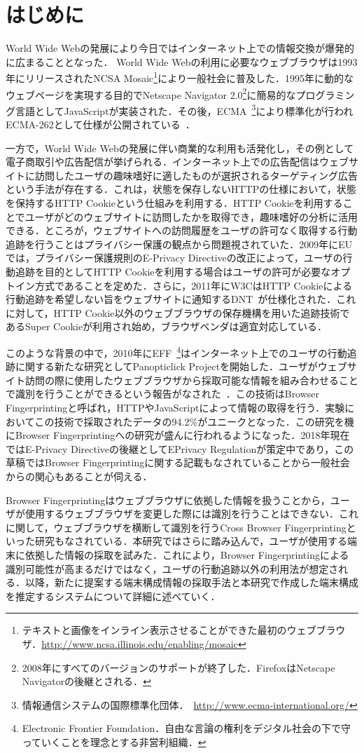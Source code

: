 \section{はじめに}
World Wide Webの発展により今日ではインターネット上での情報交換が爆発的に広まることとなった． World Wide Webの利用に必要なウェブブラウザは1993年にリリースされたNCSA Mosaic\footnote{テキストと画像をインライン表示させることができた最初のウェブブラウザ．\url{http://www.ncsa.illinois.edu/enabling/mosaic}}により一般社会に普及した．1995年に動的なウェブページを実現する目的でNetscape Navigator 2.0\footnote{2008年にすべてのバージョンのサポートが終了した．FirefoxはNetscape Navigatorの後継とされる．}に簡易的なプログラミング言語としてJavaScriptが実装された．その後，ECMA~\footnote{情報通信システムの国際標準化団体．~\url{http://www.ecma-international.org/}}により標準化が行われECMA-262として仕様が公開されている~\cite{ecma_262}．

一方で，World Wide Webの発展に伴い商業的な利用も活発化し，その例として電子商取引や広告配信が挙げられる．インターネット上での広告配信はウェブサイトに訪問したユーザの趣味嗜好に適したものが選択されるターゲティング広告という手法が存在する．これは，状態を保存しないHTTPの仕様において，状態を保持するHTTP Cookieという仕組みを利用する．HTTP Cookieを利用することでユーザがどのウェブサイトに訪問したかを取得でき，趣味嗜好の分析に活用できる．ところが，ウェブサイトへの訪問履歴をユーザの許可なく取得する行動追跡を行うことはプライバシー保護の観点から問題視されていた．2009年にEUでは，プライバシー保護規則のE-Privacy Directiveの改正によって，ユーザの行動追跡を目的としてHTTP Cookieを利用する場合はユーザの許可が必要なオプトイン方式であることを定めた．さらに，2011年にW3CはHTTP Cookieによる行動追跡を希望しない旨をウェブサイトに通知するDNT~\cite{dnt}が仕様化された．これに対して，HTTP Cookie以外のウェブブラウザの保存機構を用いた追跡技術であるSuper Cookieが利用され始め，ブラウザベンダは適宜対応している． 

このような背景の中で，2010年にEFF~\footnote{Electronic Frontier Foundation．自由な言論の権利をデジタル社会の下で守っていくことを理念とする非営利組織．}はインターネット上でのユーザの行動追跡に関する新たな研究としてPanopticlick Projectを開始した．ユーザがウェブサイト訪問の際に使用したウェブブラウザから採取可能な情報を組み合わせることで識別を行うことができるという報告がなされた~\cite{eckersley2010unique}．この技術はBrowser Fingerprintingと呼ばれ，HTTPやJavaScriptによって情報の取得を行う．実験においてこの技術で採取されたデータの94.2\%がユニークとなった．この研究を機にBrowser Fingerprintingへの研究が盛んに行われるようになった．2018年現在ではE-Privacy Directiveの後継としてEPrivacy Regulationが策定中であり，この草稿ではBrowser Fingerprintingに関する記載もなされていることから一般社会からの関心もあることが伺える．

Browser Fingerprintingはウェブブラウザに依拠した情報を扱うことから，ユーザが使用するウェブブラウザを変更した際には識別を行うことはできない．これに関して，ウェブブラウザを横断して識別を行うCross Browser Fingerprintingといった研究もなされている．本研究ではさらに踏み込んで，ユーザが使用する端末に依拠した情報の採取を試みた．これにより，Browser Fingerprintingによる識別可能性が高まるだけではなく，ユーザの行動追跡以外の利用法が想定される．以降，新たに提案する端末構成情報の採取手法と本研究で作成した端末構成を推定するシステムについて詳細に述べていく．
